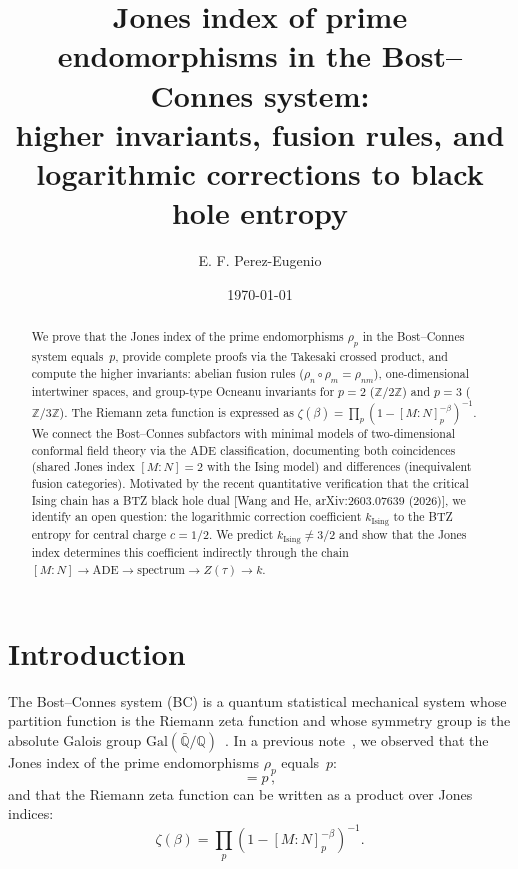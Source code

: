 \documentclass[aps,prl,twocolumn,superscriptaddress,showpacs]{revtex4-2}
\begin{document}
\title{Jones index of prime endomorphisms in the Bost--Connes system:\\ higher invariants, fusion rules, and logarithmic corrections to black hole entropy}

\author{E. F. Perez-Eugenio}

\date{\today}

\begin{abstract}
We prove that the Jones index of the prime endomorphisms $\rho_p$ in the Bost--Connes system equals~$p$, provide complete proofs via the Takesaki crossed product, and compute the higher invariants: abelian fusion rules ($\rho_n \circ \rho_m = \rho_{nm}$), one-dimensional intertwiner spaces, and group-type Ocneanu invariants for $p=2$ ($\mathbb{Z}/2\mathbb{Z}$) and $p=3$ ($\mathbb{Z}/3\mathbb{Z}$). The Riemann zeta function is expressed as $\zeta(\beta) = \prod_p (1 - [M{:}N]_p^{-\beta})^{-1}$. We connect the Bost--Connes subfactors with minimal models of two-dimensional conformal field theory via the ADE classification, documenting both coincidences (shared Jones index $[M{:}N]=2$ with the Ising model) and differences (inequivalent fusion categories). Motivated by the recent quantitative verification that the critical Ising chain has a BTZ black hole dual [Wang and He, arXiv:2603.07639 (2026)], we identify an open question: the logarithmic correction coefficient $k_{\mathrm{Ising}}$ to the BTZ entropy for central charge $c=1/2$. We predict $k_{\mathrm{Ising}} \neq 3/2$ and show that the Jones index determines this coefficient indirectly through the chain $[M{:}N] \to \text{ADE} \to \text{spectrum} \to Z(\tau) \to k$.
\end{abstract}

\maketitle

\section{Introduction}
\label{sec:intro}

The Bost--Connes system (BC) is a quantum statistical mechanical system whose partition function is the Riemann zeta function and whose symmetry group is the absolute Galois group $\mathrm{Gal}(\bar{\mathbb{Q}}/\mathbb{Q})$~\cite{BostConnes1995,ConnesMarcolli2008}. In a previous note~\cite{PerezEugenio2026IV}, we observed that the Jones index of the prime endomorphisms $\rho_p$ equals~$p$:
\begin{equation}
[e_p R e_p : \rho_p(R)] = p\,,
\end{equation}
and that the Riemann zeta function can be written as a product over Jones indices:
\begin{equation}
\zeta(\beta) = \prod_p \left(1 - [M{:}N]_p^{-\beta}\right)^{-1}.
\end{equation}
\end{document}

